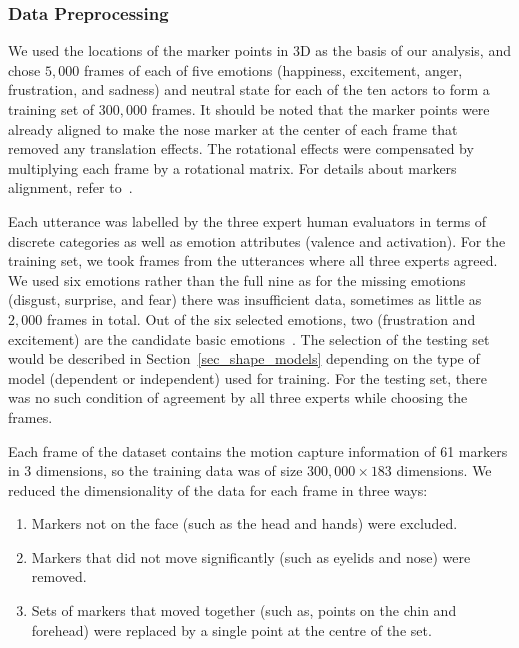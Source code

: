 \documentclass[10pt,journal,cspaper,compsoc]{IEEEtran}
\begin{document}
\subsubsection{Data Preprocessing}
\label{sec_data_preprocessing}

We used the locations of the marker points in 3D as the basis of our analysis, and chose $5,000$ frames of each of five emotions (happiness, excitement, anger, frustration, and sadness) and neutral state for each of the ten actors to form a training set of $300,000$ frames. It should be noted that the marker points were already aligned to make the nose marker at the center of each frame that removed any translation effects. The rotational effects were compensated by multiplying each frame by a rotational matrix. For details about markers alignment, refer to~\cite{Busso08}. 

Each utterance was labelled by the three expert human evaluators in terms of discrete categories as well as emotion attributes (valence and activation). For the training set, we took frames from the utterances where all three experts agreed. We used six emotions rather than the full nine as for the missing emotions (disgust, surprise, and fear) there was insufficient data, sometimes as little as $2,000$ frames in total. Out of the six selected emotions, two (frustration and excitement) are the candidate basic emotions~\cite{ortony1990s, ekman1999basic}. The selection of the testing set would be described in Section~\ref{sec_shape_models} depending on the type of model (dependent or independent) used for training. For the testing set, there was no such condition of agreement by all three experts while choosing the frames.

Each frame of the dataset contains the motion capture information of 61 markers in 3 dimensions, so the training data was of size $300,000 \times 183$ dimensions. We reduced the dimensionality of the data for each frame in three ways:

\begin{enumerate}
\item Markers not on the face (such as the head and hands) were excluded.
\item Markers that did not move significantly (such as eyelids and nose) were removed. 
\item Sets of markers that moved together (such as, points on the chin and forehead) were replaced by a single point at the centre of the set.
\end{enumerate}
\end{document}
